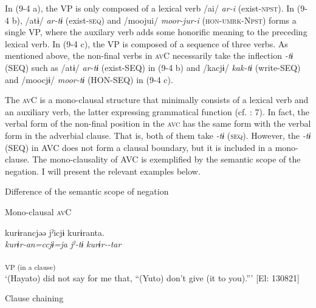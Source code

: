 In (9-4 a), the VP is only composed of a lexical verb /ai/ \textit{ar-i} (exist-\textsc{npst}). In (9-4 b), /atɨ/ \textit{ar-tɨ} (exist-\textsc{seq}) and /moojui/ \textit{moor-jur-i} (\textsc{hon}-\textsc{umrk}-N\textsc{pst}) forms a single VP, where the auxilary verb adds some honorific meaning to the preceding lexical verb. In (9-4 c), the VP is composed of a sequence of three verbs. As mentioned above, the non-final verbs in \textsc{av}C necessarily take the inflection \textit{{}-tɨ} (SEQ) such as /atɨ/ \textit{ar-tɨ} (exist-SEQ) in (9-4 b) and /kacjɨ/ \textit{kak-tɨ} (write-SEQ) and /moocjɨ/ \textit{moor-tɨ} (HON-SEQ) in (9-4 c).

  The \textsc{av}C is a mono-clausal structure that minimally consists of a lexical verb and an auxiliary verb, the latter expressing grammatical function (cf. \citealt{Anderson2006}: 7). In fact, the verbal form of the non-final position in the \textsc{avc} has the same form with the verbal form in the adverbial clause. That is, both of them take \textit{{}-tɨ} (\textsc{seq}). However, the \textit{{}-tɨ} (SEQ) in AVC does not form a clausal boundary, but it is included in a mono-clause. The mono-clausality of AVC is exemplified by the semantic scope of the negation. I will present the relevant examples below.

\ea   Difference of the semantic scope of negation \label{ex:9.5}

  \ea\label{ex:9.5a} Mono-clausal \textsc{av}C\\

 \gllll  kurɨrancjəə  jˀicjɨ  kurɨranta.\\
    \textit{kurɨr-an=ccjɨ=ja}  \textit{jˀ-tɨ}  \textit{kurɨr--tar}\\
    [give-\textsc{neg}=\textsc{qt}=\textsc{top}  say-\textsc{seq}  \textsc{ben}-NEG-\textsc{pst}]\\
    [Complement  Lex. verb  Aux. verb]\textsubscript{VP (in a clause)}\\
    \glt     ‘(Hayato) did not say for me that, “(Yuto) don’t give (it to you).”’ [El: 130821]

  \ex\label{ex:9.5b} Clause chaining\\

